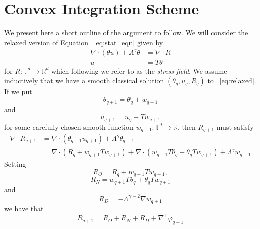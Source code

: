 \documentclass[12pt,reqno,letterpaper]{amsart}
\numberwithin{equation}{section}
\newcommand{\1}{{\bf 1}}
\newcommand{\2}{{\bf 2}}
\newcommand{\R}{\mathbb R}
\newcommand{\T}{\mathbb T}
\theoremstyle{remark}
\theoremstyle{remark}
\begin{document}
\section{Convex Integration Scheme}\label{Section3}
We present here a short outline of the argument to follow. We will consider the relaxed version of Equation ~\eqref{eq:stat_eqn} given by
\begin{equation}\label{eq:relaxed}
\begin{split}
    \nabla \cdot (\theta u) + \Lambda^\gamma \theta &= \nabla \cdot R\\
    u &= T\theta
    \end{split}
\end{equation}
for $R : \T^d \to \R^d$ which following \cite{IV} we refer to as the \textit{stress field}. We assume inductively that we have a smooth classical solution $(\theta_q,u_q,R_q)$ to ~\eqref{eq:relaxed}. If we put
\begin{equation}\label{eq:thetaq+1}
    \theta_{q+1} = \theta_q + w_{q+1}
\end{equation}
and
\begin{equation}\label{eq:uq+1}
    u_{q+1} = u_q + Tw_{q+1}
\end{equation}
for some carefully chosen smooth function $w_{q+1}:\T^d \to \R$, then $R_{q+1}$ must satisfy
\begin{equation*}
    \begin{split}
        \nabla \cdot R_{q+1} &= \nabla \cdot (\theta_{q+1}u_{q+1}) + \Lambda^\gamma \theta_{q+1}\\
        &= \nabla \cdot (R_q + w_{q+1}Tw_{q+1}) + \nabla \cdot (w_{q+1} T\theta_q + \theta_q Tw_{q+1}) + \Lambda^\gamma w_{q+1}
    \end{split}
\end{equation*}
Setting
\begin{equation}\label{eq:osc_error}
    R_O = R_q + w_{q+1}Tw_{q+1},
\end{equation}
\begin{equation}\label{eq:Nash_error}
    R_N = w_{q+1}T\theta_q + \theta_qTw_{q+1}
\end{equation}
and
\begin{equation}\label{eq:dis_error}
    R_D = -\Lambda^{\gamma-2} \nabla w_{q+1}
\end{equation}
we have that
\begin{equation}\label{eq:Rq+1}
    R_{q+1} = R_O + R_N + R_D + \nabla^\perp \varphi_{q+1}
\end{equation}
\end{document}
